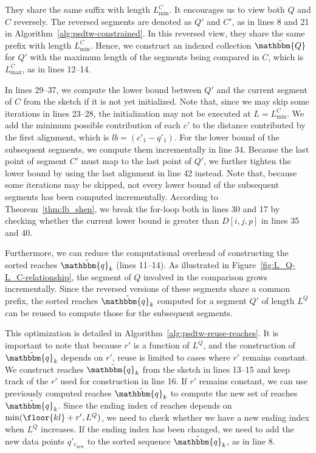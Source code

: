 They share the same suffix with length $L_{\min}^C$.
It encourages us to view both $Q$ and $C$ reversely.
The reversed segments are denoted as $Q'$ and $C'$, as in lines 8 and 21 in Algorithm~\ref{alg:psdtw-constrained}.
In this reversed view, they share the same prefix with length $L_{\min}^C$.
Hence, we construct an indexed collection $\tilde{\mathbbm{Q}}$ for $Q'$ with the maximum length of the segments being compared in $C$, which is $L^C_{\max}$, as in lines 12--14.

In lines 29--37, we compute the lower bound between $Q'$ and the current segment of $C$ from the sketch if it is not yet initialized.
Note that, since we may skip some iterations in lines 23--28, the initialization may not be executed at $L = L_{\min}^C$.
We add the minimum possible contribution of each $c'$ to the distance contributed by the first alignment, which is $\textit{lb} = (c'_1 - q'_1)$.
For the lower bound of the subsequent segments, we compute them incrementally in line 34.
Because the last point of segment $C'$ must map to the last point of $Q'$, we further tighten the lower bound by using the last alignment in line 42 instead.
%
Note that, because some iterations may be skipped, not every lower bound of the subsequent segments has been computed incrementally.
%
According to Theorem~\ref{thm:lb_shen}, we break the for-loop both in lines 30 and 17 by checking whether the current lower bound is greater than $D[i,j,p]$ in lines 35 and 40.

Furthermore, we can reduce the computational overhead of constructing the sorted reaches $\tilde{\mathbbm{q}_k}$ (lines 11--14). As illustrated in Figure~\ref{fig:L_Q-L_C-relationship}, the segment of $Q$ involved in the comparison grows incrementally. Since the reversed versions of these segments share a common prefix, the sorted reaches $\tilde{\mathbbm{q}_k}$ computed for a segment $Q'$ of length $L^Q$ can be reused to compute those for the subsequent segments. 

This optimization is detailed in Algorithm~\ref{alg:psdtw-reuse-reaches}. 
It is important to note that because $r'$ is a function of $L^Q$, and the construction of $\tilde{\mathbbm{q}_k}$ depends on $r'$, reuse is limited to cases where $r'$ remains constant.
We construct reaches $\tilde{\mathbbm{q}_k}$ from the sketch in lines 13--15 and keep track of the $r'$ used for construction in line 16.
If $r'$ remains constant, we can use previously computed reaches $\tilde{\mathbbm{q}_k}$ to compute the new set of reaches $\tilde{\mathbbm{q}_k}$.
Since the ending index of reaches depends on $\min(\floor{kl} + r', L^Q)$, we need to check whether we have a new ending index when $L^Q$ increases.
If the ending index has been changed, we need to add the new data points $q'_{e_\mathrm{new}}$ to the sorted sequence $\tilde{\mathbbm{q}}_k$, as in line 8.

